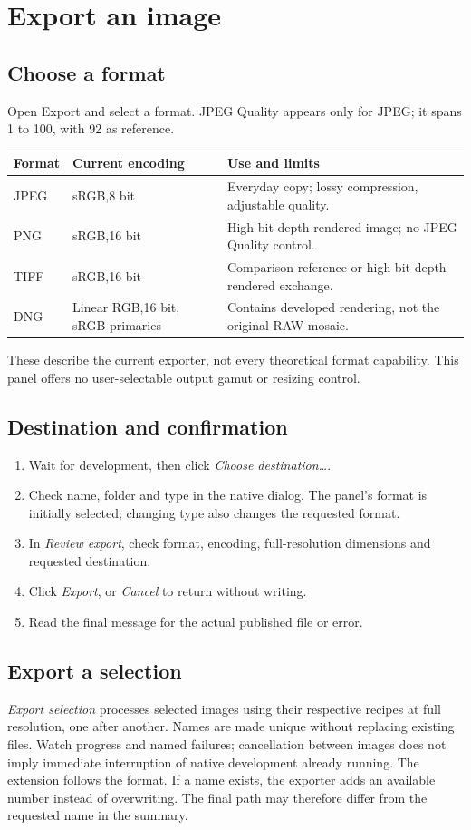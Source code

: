 \chapter{Export an image}
\label{chap:export}
\section{Choose a format}
Open Export and select a format. JPEG Quality appears only for JPEG;
it spans 1 to 100, with 92 as reference.
\begin{longtable}{@{}L{2cm}L{4.6cm}L{7cm}@{}}
\toprule Format & Current encoding & Use and limits\\\midrule\endhead
JPEG & sRGB,8 bit & Everyday copy; lossy compression, adjustable quality.\\
PNG & sRGB,16 bit & High-bit-depth rendered image; no JPEG Quality control.\\
TIFF & sRGB,16 bit & Comparison reference or high-bit-depth rendered exchange.\\
DNG & Linear RGB,16 bit, sRGB primaries & Contains developed rendering, not the original RAW mosaic.\\
\bottomrule
\end{longtable}
These describe the current exporter, not every theoretical format capability.
This panel offers no user-selectable output gamut or resizing control.

\section{Destination and confirmation}
\begin{enumerate}
\item Wait for development, then click \emph{Choose destination…}.
\item Check name, folder and type in the native dialog. The panel's format
is initially selected; changing type also changes the requested format.
\item In \emph{Review export}, check format, encoding, full-resolution
dimensions and requested destination.
\item Click \emph{Export}, or \emph{Cancel} to return without writing.
\item Read the final message for the actual published file or error.
\end{enumerate}
\section{Export a selection}
\emph{Export selection} processes selected images using their respective
recipes at full resolution, one after another. Names are made unique without
replacing existing files. Watch progress and named failures; cancellation
between images does not imply immediate interruption of native development
already running.
The extension follows the format. If a name exists, the exporter adds an
available number instead of overwriting. The final path may therefore differ
from the requested name in the summary.

